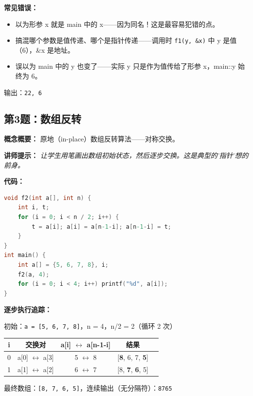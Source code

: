 \textbf{常见错误：}
\begin{itemize}
    \item 以为形参 x 就是 main 中的 x——因为同名！这是最容易犯错的点。
    \item 搞混哪个参数是值传递、哪个是指针传递——调用时 \texttt{f1(y, \&x)} 中 y 是值（6），\&x 是地址。
    \item 误以为 main 中的 y 也变了——实际 y 只是作为值传给了形参 x，main::y 始终为 6。
\end{itemize}

{\color{highlight}输出：\texttt{22, 6}}

\subsection{第3题：数组反转}

\textbf{概念概要：} 原地（in-place）数组反转算法——对称交换。

\medskip
\textbf{讲师提示：} \textit{让学生用笔画出数组初始状态，然后逐步交换。这是典型的\"双指针\"思想的前身。}

\smallskip
\textbf{代码：}
\begin{lstlisting}[language=C]
void f2(int a[], int n) {
    int i, t;
    for (i = 0; i < n / 2; i++) {
        t = a[i]; a[i] = a[n-1-i]; a[n-1-i] = t;
    }
}
int main() {
    int a[] = {5, 6, 7, 8}, i;
    f2(a, 4);
    for (i = 0; i < 4; i++) printf("%d", a[i]);
}
\end{lstlisting}

\smallskip
\textbf{逐步执行追踪：}

\noindent 初始：\texttt{a = [5, 6, 7, 8]}，n = 4，n/2 = 2（循环 2 次）

\begin{center}
\begin{tabular}{c|c|c|c|c}
\hline
\textbf{i} & \textbf{交换对} & \textbf{a[i]} $\leftrightarrow$ \textbf{a[n-1-i]} & \textbf{结果} \\
\hline
0 & a[0] $\leftrightarrow$ a[3] & 5 $\leftrightarrow$ 8 & [\textbf{8}, 6, 7, \textbf{5}] \\
1 & a[1] $\leftrightarrow$ a[2] & 6 $\leftrightarrow$ 7 & [8, \textbf{7}, \textbf{6}, 5] \\
\hline
\end{tabular}
\end{center}

\noindent 最终数组：\texttt{[8, 7, 6, 5]}，连续输出（无分隔符）：\texttt{8765}


